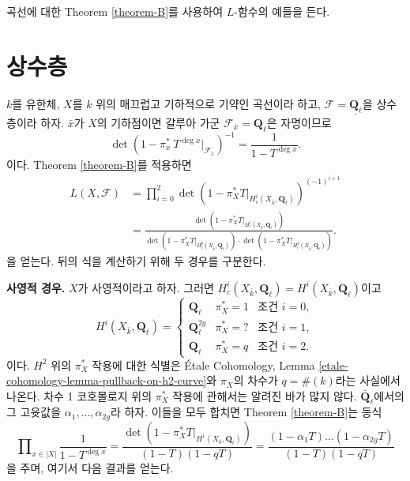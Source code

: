\noindent
곡선에 대한 Theorem \ref{theorem-B}를 사용하여 $L$-함수의 예들을 든다.





\section{상수층}
\label{section-L-function-constant-sheaf}

\noindent
$k$를 유한체, $X$를 $k$ 위의 매끄럽고 기하적으로 기약인 곡선이라 하고,
$\mathcal{F} = \underline{\mathbf{Q}_\ell}$을 상수층이라 하자. $\bar x$가
$X$의 기하점이면 갈루아 가군
$\mathcal{F}_{\bar x} = \mathbf{Q}_\ell$은 자명이므로
$$
\det(1-\pi_x^*\ T^{\deg x} |_{\mathcal{F}_{\bar x}})^{-1} =
\frac{1}{1-T^{\deg x}}.
$$
이다. Theorem \ref{theorem-B}를 적용하면
\begin{align*}
L(X, \mathcal{F})
& =
\prod_{i = 0}^2
\det(1 - \pi_X^*T |_{H_c^i(X_{\bar k}, \mathbf{Q}_\ell)})^{(-1)^{i+1}} \\
& =
\frac{\det(1 - \pi_X^*T |_{H_c^1(X_{\bar k}, \mathbf{Q}_\ell)})}{
\det(1 - \pi_X^*T |_{H_c^0(X_{\bar k}, \mathbf{Q}_\ell)})
\cdot \det(1 - \pi_X^*T |_{H_c^2(X_{\bar k}, \mathbf{Q}_\ell)})}.
\end{align*}
을 얻는다. 뒤의 식을 계산하기 위해 두 경우를 구분한다.


\medskip\noindent
{\bf 사영적 경우.}
$X$가 사영적이라고 하자. 그러면 $H_c^i(X_{\bar k}, \mathbf{Q}_\ell) =
H^i(X_{\bar k}, \mathbf{Q}_\ell)$이고
$$
H^i(X_{\bar k}, \mathbf{Q}_\ell) =
\left\{
\begin{matrix}
\mathbf{Q}_\ell & \pi_X^* = 1 & \text{조건 }i = 0, \\
\mathbf{Q}_\ell^{2g} & \pi_X^* = ? & \text{조건 }i = 1, \\
\mathbf{Q}_\ell & \pi_X^* = q & \text{조건 }i = 2.
\end{matrix}
\right.
$$
이다. $H^2$ 위의 $\pi_X^*$ 작용에 대한 식별은
\'Etale Cohomology, Lemma \ref{etale-cohomology-lemma-pullback-on-h2-curve}와
$\pi_X$의 차수가 $q = \#(k)$라는 사실에서 나온다.
차수 1 코호몰로지 위의 $\pi_X^*$ 작용에 관해서는 알려진 바가 많지 않다.
$\bar{\mathbf{Q}}_\ell$에서의 그 고윳값을
$\alpha_1, \ldots, \alpha_{2g}$라 하자. 이들을 모두 합치면
Theorem \ref{theorem-B}는 등식
$$
\prod\nolimits_{x \in |X|} \frac{1}{1 - T^{\deg x}} =
\frac{\det(1- \pi_X^* T|_{H^1(X_{\bar k}, \mathbf{Q}_\ell)})}{(1-T)(1-qT)} =
\frac{(1 - \alpha_1 T) \ldots (1 - \alpha_{2g}T)}{(1-T)(1-qT)}
$$
을 주며, 여기서 다음 결과를 얻는다.

